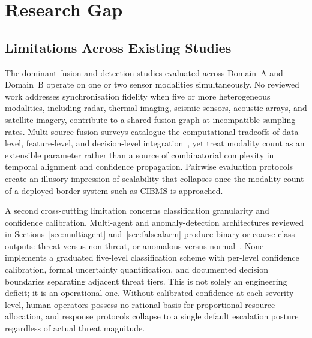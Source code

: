 
\section{Research Gap}
\label{sec:gap}

\subsection{Limitations Across Existing Studies}

The dominant fusion and detection studies evaluated across Domain~A and Domain~B operate on one or two sensor modalities simultaneously. No reviewed work addresses synchronisation fidelity when five or more heterogeneous modalities, including radar, thermal imaging, seismic sensors, acoustic arrays, and satellite imagery, contribute to a shared fusion graph at incompatible sampling rates. Multi-source fusion surveys catalogue the computational tradeoffs of data-level, feature-level, and decision-level integration~\cite{meng2023multisource}, yet treat modality count as an extensible parameter rather than a source of combinatorial complexity in temporal alignment and confidence propagation. Pairwise evaluation protocols create an illusory impression of scalability that collapses once the modality count of a deployed border system such as CIBMS is approached.

A second cross-cutting limitation concerns classification granularity and confidence calibration. Multi-agent and anomaly-detection architectures reviewed in Sections~\ref{sec:multiagent} and~\ref{sec:falsealarm} produce binary or coarse-class outputs: threat versus non-threat, or anomalous versus normal~\cite{hassan2025multiagent, agenticcyber2025}. None implements a graduated five-level classification scheme with per-level confidence calibration, formal uncertainty quantification, and documented decision boundaries separating adjacent threat tiers. This is not solely an engineering deficit; it is an operational one. Without calibrated confidence at each severity level, human operators possess no rational basis for proportional resource allocation, and response protocols collapse to a single default escalation posture regardless of actual threat magnitude.

